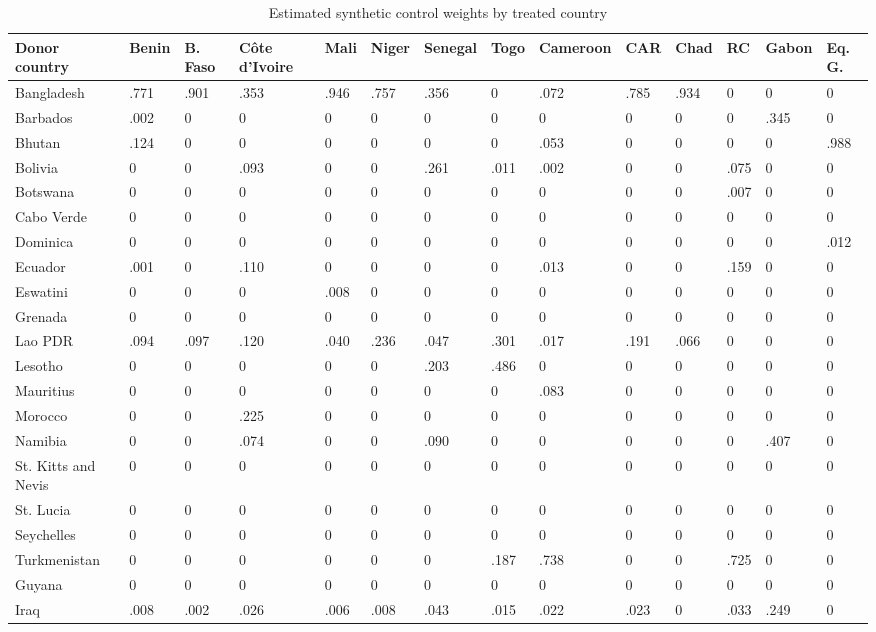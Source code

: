 \begin{table}
\scriptsize
\caption{Estimated synthetic control weights by treated country}
\centering
\begin{tabular}[t]{llllllllllllll}
\toprule
Donor country & Benin & B. Faso & Côte d'Ivoire & Mali & Niger & Senegal & Togo & Cameroon & CAR & Chad & RC & Gabon & Eq. G.\\
\midrule
Bangladesh & .771 & .901 & .353 & .946 & .757 & .356 & 0 & .072 & .785 & .934 & 0 & 0 & 0\\
Barbados & .002 & 0 & 0 & 0 & 0 & 0 & 0 & 0 & 0 & 0 & 0 & .345 & 0\\
Bhutan & .124 & 0 & 0 & 0 & 0 & 0 & 0 & .053 & 0 & 0 & 0 & 0 & .988\\
Bolivia & 0 & 0 & .093 & 0 & 0 & .261 & .011 & .002 & 0 & 0 & .075 & 0 & 0\\
Botswana & 0 & 0 & 0 & 0 & 0 & 0 & 0 & 0 & 0 & 0 & .007 & 0 & 0\\
\addlinespace
Cabo Verde & 0 & 0 & 0 & 0 & 0 & 0 & 0 & 0 & 0 & 0 & 0 & 0 & 0\\
Dominica & 0 & 0 & 0 & 0 & 0 & 0 & 0 & 0 & 0 & 0 & 0 & 0 & .012\\
Ecuador & .001 & 0 & .110 & 0 & 0 & 0 & 0 & .013 & 0 & 0 & .159 & 0 & 0\\
Eswatini & 0 & 0 & 0 & .008 & 0 & 0 & 0 & 0 & 0 & 0 & 0 & 0 & 0\\
Grenada & 0 & 0 & 0 & 0 & 0 & 0 & 0 & 0 & 0 & 0 & 0 & 0 & 0\\
\addlinespace
Lao PDR & .094 & .097 & .120 & .040 & .236 & .047 & .301 & .017 & .191 & .066 & 0 & 0 & 0\\
Lesotho & 0 & 0 & 0 & 0 & 0 & .203 & .486 & 0 & 0 & 0 & 0 & 0 & 0\\
Mauritius & 0 & 0 & 0 & 0 & 0 & 0 & 0 & .083 & 0 & 0 & 0 & 0 & 0\\
Morocco & 0 & 0 & .225 & 0 & 0 & 0 & 0 & 0 & 0 & 0 & 0 & 0 & 0\\
Namibia & 0 & 0 & .074 & 0 & 0 & .090 & 0 & 0 & 0 & 0 & 0 & .407 & 0\\
\addlinespace
St. Kitts and Nevis & 0 & 0 & 0 & 0 & 0 & 0 & 0 & 0 & 0 & 0 & 0 & 0 & 0\\
St. Lucia & 0 & 0 & 0 & 0 & 0 & 0 & 0 & 0 & 0 & 0 & 0 & 0 & 0\\
Seychelles & 0 & 0 & 0 & 0 & 0 & 0 & 0 & 0 & 0 & 0 & 0 & 0 & 0\\
Turkmenistan & 0 & 0 & 0 & 0 & 0 & 0 & .187 & .738 & 0 & 0 & .725 & 0 & 0\\
Guyana & 0 & 0 & 0 & 0 & 0 & 0 & 0 & 0 & 0 & 0 & 0 & 0 & 0\\
\addlinespace
Iraq & .008 & .002 & .026 & .006 & .008 & .043 & .015 & .022 & .023 & 0 & .033 & .249 & 0\\
\bottomrule
\end{tabular}
\end{table}